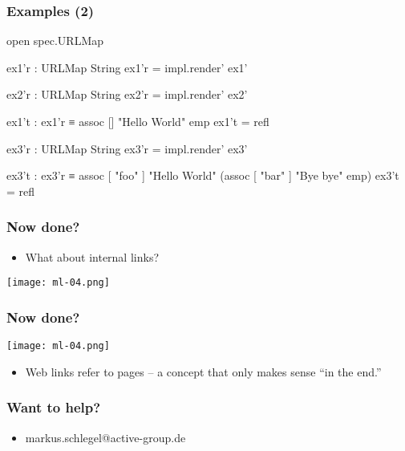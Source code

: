 \documentclass[aspectratio=169]{beamer}
\begin{document}
\begin{frame}
\frametitle{Examples (2)}
\begin{code}
open spec.URLMap

ex1'r : URLMap String
ex1'r = impl.render' ex1'

ex2'r : URLMap String
ex2'r = impl.render' ex2'

ex1't : ex1'r ≡ assoc [] "Hello World" emp
ex1't = refl

ex3'r : URLMap String
ex3'r = impl.render' ex3'

ex3't : ex3'r ≡ assoc [ "foo" ] "Hello World"
               (assoc [ "bar" ] "Bye bye"
                emp)
ex3't = refl
\end{code}
\end{frame}


\begin{frame}
\frametitle{Now done?}
\begin{itemize}
  \item What about internal links?
\end{itemize}
\texttt{[image: ml-04.png]}
\end{frame}

\begin{frame}
\frametitle{Now done?}
\texttt{[image: ml-04.png]}
\begin{itemize}
  \item Web links refer to pages -- a concept that only makes sense ``in the end.''
\end{itemize}
\end{frame}

\begin{frame}
\frametitle{Want to help?}
\begin{itemize}
  \item markus.schlegel@active-group.de
\end{itemize}
\end{frame}
\end{document}
